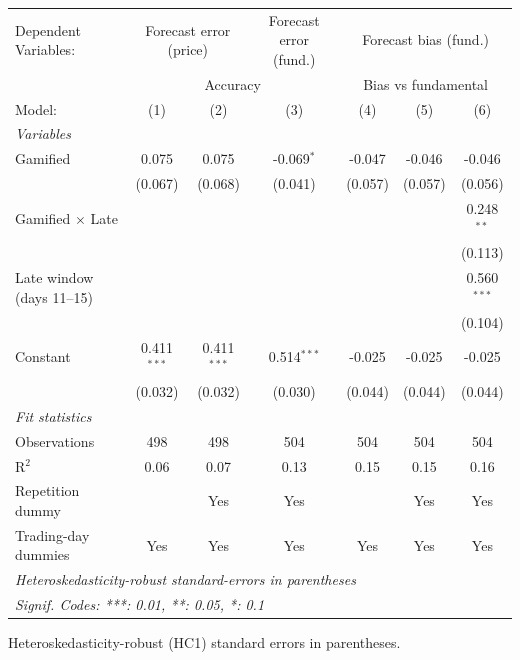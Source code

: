 \begingroup
\centering
\begin{tabular}{lcccccc}
   \tabularnewline \midrule \midrule
   Dependent Variables: & \multicolumn{2}{c}{Forecast error (price)} & Forecast error (fund.) & \multicolumn{3}{c}{Forecast bias (fund.)}\\
    & \multicolumn{3}{c}{Accuracy} & \multicolumn{3}{c}{Bias vs fundamental} \\ 
   Model:                    & (1)           & (2)           & (3)           & (4)     & (5)     & (6)\\  
   \midrule
   \emph{Variables}\\
   Gamified                  & 0.075         & 0.075         & -0.069$^{*}$  & -0.047  & -0.046  & -0.046\\   
                             & (0.067)       & (0.068)       & (0.041)       & (0.057) & (0.057) & (0.056)\\   
   Gamified $\times$ Late    &               &               &               &         &         & 0.248$^{**}$\\   
                             &               &               &               &         &         & (0.113)\\   
   Late window (days 11--15) &               &               &               &         &         & 0.560$^{***}$\\   
                             &               &               &               &         &         & (0.104)\\   
   Constant                  & 0.411$^{***}$ & 0.411$^{***}$ & 0.514$^{***}$ & -0.025  & -0.025  & -0.025\\   
                             & (0.032)       & (0.032)       & (0.030)       & (0.044) & (0.044) & (0.044)\\   
   \midrule
   \emph{Fit statistics}\\
   Observations              & 498           & 498           & 504           & 504     & 504     & 504\\  
   R$^2$                     & 0.06          & 0.07          & 0.13          & 0.15    & 0.15    & 0.16\\  
   Repetition dummy          &               & Yes           & Yes           &         & Yes     & Yes\\  
   Trading-day dummies       & Yes           & Yes           & Yes           & Yes     & Yes     & Yes\\  
   \midrule \midrule
   \multicolumn{7}{l}{\emph{Heteroskedasticity-robust standard-errors in parentheses}}\\
   \multicolumn{7}{l}{\emph{Signif. Codes: ***: 0.01, **: 0.05, *: 0.1}}\\
\end{tabular}
 
\par \raggedright 
Heteroskedasticity-robust (HC1) standard errors in parentheses.
\par\endgroup
